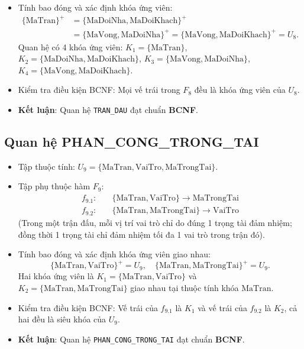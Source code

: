 \begin{itemize}
    \item Tính bao đóng và xác định khóa ứng viên:
    \begin{align*}
        \{\text{MaTran}\}^+ &= \{\text{MaDoiNha}, \text{MaDoiKhach}\}^+ \\
                            &= \{\text{MaVong}, \text{MaDoiNha}\}^+ = \{\text{MaVong}, \text{MaDoiKhach}\}^+ = U_8.
    \end{align*}
    Quan hệ có 4 khóa ứng viên: $K_1 = \{\text{MaTran}\}$, $K_2 = \{\text{MaDoiNha}, \text{MaDoiKhach}\}$, $K_3 = \{\text{MaVong}, \text{MaDoiNha}\}$, $K_4 = \{\text{MaVong}, \text{MaDoiKhach}\}$.
    \item Kiểm tra điều kiện BCNF: Mọi vế trái trong $F_8$ đều là khóa ứng viên của $U_8$.
    \item \textbf{Kết luận}: Quan hệ \texttt{TRAN\_DAU} đạt chuẩn \textbf{BCNF}.
\end{itemize}

\subsection{Quan hệ PHAN\_CONG\_TRONG\_TAI}
\begin{itemize}
    \item Tập thuộc tính: $U_9 = \{\text{MaTran}, \text{VaiTro}, \text{MaTrongTai}\}$.
    \item Tập phụ thuộc hàm $F_9$:
    \begin{align*}
        f_{9.1}: & \quad \{\text{MaTran}, \text{VaiTro}\} \rightarrow \text{MaTrongTai} \\
        f_{9.2}: & \quad \{\text{MaTran}, \text{MaTrongTai}\} \rightarrow \text{VaiTro}
    \end{align*}
    (Trong một trận đấu, mỗi vị trí vai trò chỉ do đúng 1 trọng tài đảm nhiệm; đồng thời 1 trọng tài chỉ đảm nhiệm tối đa 1 vai trò trong trận đó).
    \item Tính bao đóng và xác định khóa ứng viên giao nhau:
    $$\{\text{MaTran}, \text{VaiTro}\}^+ = U_9, \quad \{\text{MaTran}, \text{MaTrongTai}\}^+ = U_9.$$
    Hai khóa ứng viên là $K_1 = \{\text{MaTran}, \text{VaiTro}\}$ và $K_2 = \{\text{MaTran}, \text{MaTrongTai}\}$ giao nhau tại thuộc tính khóa $\text{MaTran}$.
    \item Kiểm tra điều kiện BCNF: Vế trái của $f_{9.1}$ là $K_1$ và vế trái của $f_{9.2}$ là $K_2$, cả hai đều là siêu khóa của $U_9$.
    \item \textbf{Kết luận}: Quan hệ \texttt{PHAN\_CONG\_TRONG\_TAI} đạt chuẩn \textbf{BCNF}.
\end{itemize}

